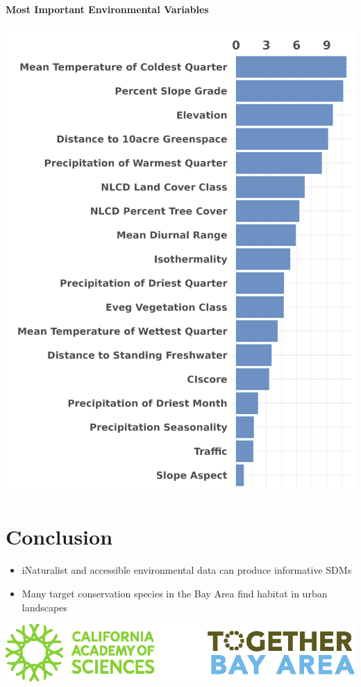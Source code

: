 \documentclass[a0paper,fleqn]{betterposter}
\begin{document}
{\vspace{1in}
\textbf{Most Important Environmental Variables}
\begin{center}
    \includegraphics[width = \textwidth]{img/predictor.png}
\end{center}

\vspace{1cm}
\section{Conclusion}
\vspace{-1cm}
\begin{itemize}
\item iNaturalist and accessible environmental data can produce informative SDMs
\item Many target conservation species in the Bay Area find habitat in urban landscapes
\end{itemize}

\vfill

\begin{center}

\includegraphics[width=.8\textwidth]{img/combined_logo.eps}\\
\end{center}
}
\end{document}
